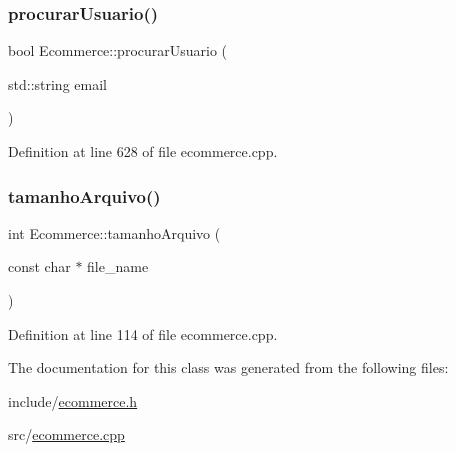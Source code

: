 \subsubsection{\texorpdfstring{procurar\+Usuario()}{procurarUsuario()}}
{\footnotesize\ttfamily bool Ecommerce\+::procurar\+Usuario (\begin{DoxyParamCaption}\item[{std\+::string}]{email }\end{DoxyParamCaption})}



Definition at line 628 of file ecommerce.\+cpp.

\mbox{\label{class_ecommerce_acd1391717ff24f1186ffa2921db5adfe}} 
\subsubsection{\texorpdfstring{tamanho\+Arquivo()}{tamanhoArquivo()}}
{\footnotesize\ttfamily int Ecommerce\+::tamanho\+Arquivo (\begin{DoxyParamCaption}\item[{const char $\ast$}]{file\+\_\+name }\end{DoxyParamCaption})}



Definition at line 114 of file ecommerce.\+cpp.



The documentation for this class was generated from the following files\+:\begin{DoxyCompactItemize}
\item 
include/\hyperlink{ecommerce_8h}{ecommerce.\+h}\item 
src/\hyperlink{ecommerce_8cpp}{ecommerce.\+cpp}\end{DoxyCompactItemize}
